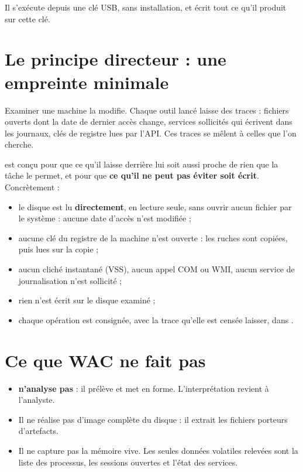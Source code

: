 \documentclass[11pt,a4paper,oneside]{report}
\begin{document}
Il s'exécute depuis une clé USB, sans installation, et écrit tout ce qu'il
produit sur cette clé.

\section{Le principe directeur : une empreinte minimale}

Examiner une machine la modifie. Chaque outil lancé laisse des traces : fichiers
ouverts dont la date de dernier accès change, services sollicités qui écrivent
dans les journaux, clés de registre lues par l'API. Ces traces se mêlent à celles
que l'on cherche.

\wac{} est conçu pour que ce qu'il laisse derrière lui soit aussi proche de rien
que la tâche le permet, et pour que \textbf{ce qu'il ne peut pas éviter soit
écrit}. Concrètement :

\begin{itemize}
  \item le disque est lu \textbf{directement}, en lecture seule, sans ouvrir aucun
        fichier par le système : aucune date d'accès n'est modifiée ;
  \item aucune clé du registre de la machine n'est ouverte : les ruches sont
        copiées, puis lues sur la copie ;
  \item aucun cliché instantané (VSS), aucun appel COM ou WMI, aucun service de
        journalisation n'est sollicité ;
  \item rien n'est écrit sur le disque examiné ;
  \item chaque opération est consignée, avec la trace qu'elle est censée laisser,
        dans .
\end{itemize}

\section{Ce que WAC ne fait pas}

\begin{itemize}
  \item \wac{} \textbf{n'analyse pas} : il prélève et met en forme. L'interprétation
        revient à l'analyste.
  \item Il ne réalise pas d'image complète du disque : il extrait les fichiers
        porteurs d'artefacts.
  \item Il ne capture pas la mémoire vive. Les seules données volatiles relevées
        sont la liste des processus, les sessions ouvertes et l'état des
        services.
\end{itemize}
\end{document}
